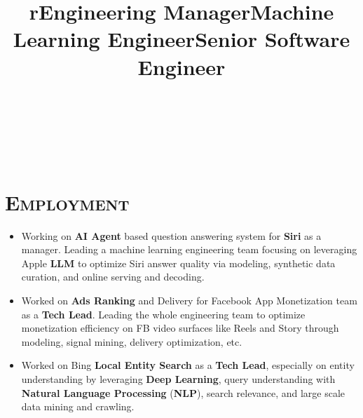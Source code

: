 \begin{resume}

\begin{formatb}
  \title{r}\\
  \\
  \body\\
\end{formatb}

\vspace*{-16pt}
\section{\textsc{Employment}}

\title{Engineering Manager}
\begin{position}
\vspace*{-8pt}
\begin{itemize}
\item Working on \textbf{AI Agent} based question answering system for \textbf{Siri} as a manager. Leading a machine learning engineering team focusing on leveraging Apple \textbf{LLM} to optimize Siri answer quality via modeling, synthetic data curation, and online serving and decoding.
\end{itemize} 
\end{position}

\title{Machine Learning Engineer}
\begin{position}
\vspace*{-8pt}
\begin{itemize}
\item Worked on \textbf{Ads Ranking} and Delivery for Facebook App Monetization team as a \textbf{Tech Lead}. Leading the whole engineering team to optimize monetization efficiency on FB video surfaces like Reels and Story through modeling, signal mining, delivery optimization, etc.
\end{itemize} 
\end{position}

\title{Senior Software Engineer}
\begin{position}
\vspace*{-8pt}
\begin{itemize}
\item Worked on Bing \textbf{Local Entity Search} as a \textbf{Tech Lead}, especially on entity understanding by leveraging \textbf{Deep Learning}, query understanding with \textbf{Natural Language Processing} (\textbf{NLP}), search relevance, and large scale data mining and crawling.
\end{itemize} 
\end{position}


\end{resume}
